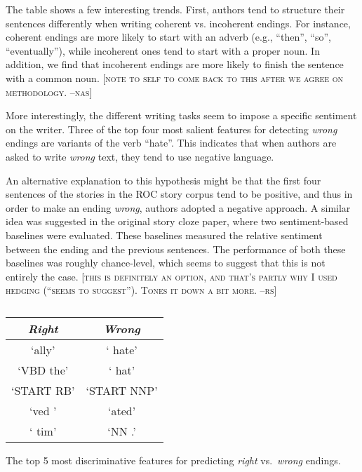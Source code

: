 \documentclass[11pt,a4paper]{article}
\newcommand{\resolved}[1]{}
\newcommand{\roy}[1]{{\color{orange}\textsc{[#1 --rs]}}}
\newcommand{\yc}[1]{{\color{bblue}\{\textit{#1}\}$_{yc}$}}
\newcommand{\nascomment}[1]{{\color{blue}\textsc{[#1 --nas]}}}
\begin{document}
The table shows a few interesting trends. 
First, authors tend to structure their sentences differently when writing {coherent}  vs. {incoherent} endings.
For instance, {coherent} endings are more likely to start with an adverb (e.g., ``then'', ``so'', ``eventually''), while {incoherent} ones tend to start with a proper noun.
In addition, we find that {incoherent} endings are more likely to
finish the sentence with a common noun.  \nascomment{note to self to come back
  to this after we agree on methodology.}

More interestingly, the different writing tasks seem to impose a specific sentiment on the writer. 
Three of the top four most salient features for detecting {\it wrong} endings are variants of the verb ``hate''.
This indicates that when authors are asked to write {\it wrong} text, they tend to use negative language.

An alternative explanation to this hypothesis might be that the first four sentences of the stories in the ROC story corpus tend to be positive, and thus in order to make an ending {\it wrong}, authors adopted a negative approach. 
A similar idea was suggested in the original story cloze paper, where two sentiment-based baselines were evaluated. 
These baselines measured the relative sentiment between the ending and the previous sentences.
The performance of both these baselines was roughly chance-level, which seems to suggest that this is not entirely the case.
\resolved{\yc{Is it really because there's no statistical tendency in the original stories to have happy endings, as opposed to the alternative possibility --- the sentiment classifier used by Monstafazadeh 2016 didn't quite nail down the optimal feature encodings?}} \roy{this is definitely an option, and that's partly why I used hedging (``seems to suggest''). Tones it down a bit more.}

\begin{table}[!t]
\begin{center}
\begin{tabular}{|c|c|} \hline
\textit{\textbf{Right}} & \textit{\textbf{Wrong}}\\ \hline
`ally' & ` hate'\\ \hline
`VBD the' & ` hat'\\ \hline
`START RB' & `START NNP'\\ \hline
`ved ' & `ated'\\ \hline
` tim' & `NN .'\\ \hline

\end{tabular}
\end{center}
\caption{\label{exp1_features}}
The top 5 most discriminative features for predicting {\it right} vs.~{\it wrong} endings.\end{table}
\end{document}
